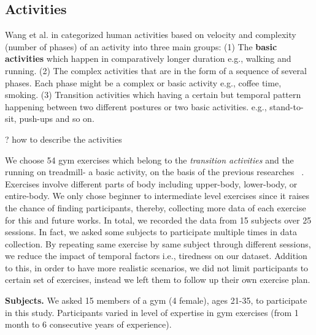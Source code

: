 \documentclass[journal,article,submit,moreauthors,pdftex]{Definitions/mdpi}
\begin{document}
\subsection{Activities}

Wang et al. in \cite{wang2019survey} categorized human activities based on velocity and complexity (number of phases) of an activity into three main groups: (1) The \textbf{basic activities} which happen in comparatively longer duration e.g., walking and running. (2)  The complex activities that are in the form of a sequence of several phases. Each phase might be a complex or basic activity e.g., coffee time, smoking. (3) Transition activities which having a certain but temporal pattern happening between two different postures or two basic activities. e.g., stand-to-sit, push-ups and so on. 


? how to describe the activities

We choose 54 gym exercises which belong to the \textit{transition activities} and the running on treadmill- a basic activity, on the basis of the previous researches ~\cite{}. Exercises involve different parts of body including upper-body, lower-body, or entire-body. We only chose beginner to intermediate level exercises since it raises the chance of finding participants, thereby, collecting more data of each exercise for this and future works. 
In total, we recorded the data from 15 subjects over 25 sessions. In fact, we asked some subjects to participate multiple times in data collection. By repeating same exercise by same subject through different sessions, we reduce the impact of temporal factors i.e., tiredness on our dataset.
Addition to this, in order to have more realistic scenarios, we did not limit participants to certain set of exercises, instead we left them to follow up their own exercise plan.

\noindent \textbf{Subjects.} We asked 15 members of a gym (4 female), ages 21-35, to participate in this study. Participants varied in level of expertise in gym exercises (from 1 month to 6 consecutive years of experience). 
\end{document}

